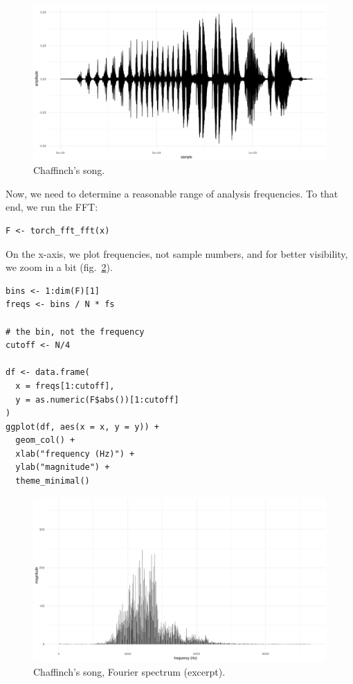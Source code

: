 \documentclass[
  letterpaper,
]{krantz}
\begin{document}
\begin{figure}[H]

{\centering \includegraphics{images/wav-chaffinch.png}

}

\caption{\label{fig-wav-chaffinch}Chaffinch's song.}

\end{figure}

Now, we need to determine a reasonable range of analysis frequencies. To
that end, we run the FFT:

\begin{verbatim}
F <- torch_fft_fft(x)
\end{verbatim}

On the x-axis, we plot frequencies, not sample numbers, and for better
visibility, we zoom in a bit (fig.~\ref{fig-wav-chaffinch-fft}).

\begin{verbatim}
bins <- 1:dim(F)[1]
freqs <- bins / N * fs

# the bin, not the frequency
cutoff <- N/4

df <- data.frame(
  x = freqs[1:cutoff],
  y = as.numeric(F$abs())[1:cutoff]
)
ggplot(df, aes(x = x, y = y)) +
  geom_col() +
  xlab("frequency (Hz)") +
  ylab("magnitude") +
  theme_minimal()
\end{verbatim}

\begin{figure}[H]

{\centering \includegraphics{images/wav-chaffinch-fft.png}

}

\caption{\label{fig-wav-chaffinch-fft}Chaffinch's song, Fourier spectrum
(excerpt).}

\end{figure}
\end{document}
